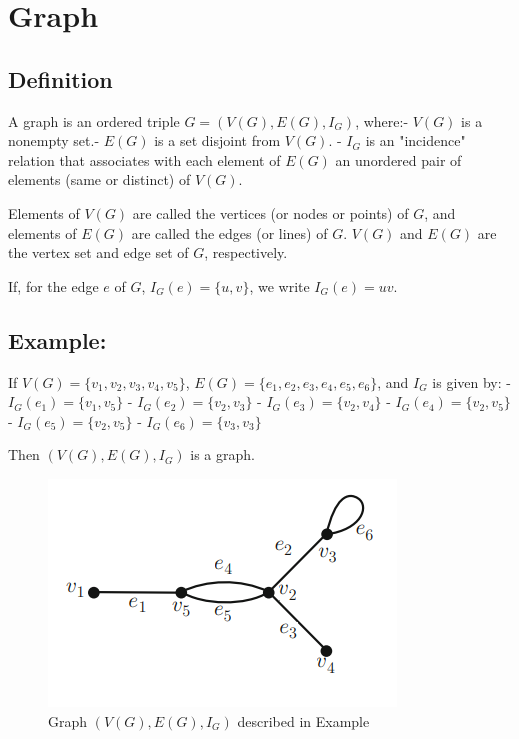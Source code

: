 \documentclass[a4paper,12pt]{report}
\begin{document}
         
         	
         	\section*{Graph}
         	\subsection*{Definition}
         	A graph is an ordered triple $G = (V(G), E(G), I_G)$, where:- $V(G)$ is a nonempty set.- $E(G)$ is a set disjoint from $V(G)$.
         	- $I_G$ is an "incidence" relation that associates with each element of $E(G)$ an unordered pair of elements (same or distinct) of $V(G)$.
         	
         	Elements of $V(G)$ are called the vertices (or nodes or points) of $G$, and elements of $E(G)$ are called the edges (or lines) of $G$. $V(G)$ and $E(G)$ are the vertex set and edge set of $G$, respectively.
         	
         	If, for the edge $e$ of $G$, $I_G(e) = \{u, v\}$, we write $I_G(e) = uv$.
         	
         	\subsection*{Example:}
         	If $V(G) = \{v_1, v_2, v_3, v_4, v_5\}$, $E(G) = \{e_1, e_2, e_3, e_4, e_5, e_6\}$, and $I_G$ is given by:
         	- $I_G(e_1) = \{v_1, v_5\}$
         	- $I_G(e_2) = \{v_2, v_3\}$
         	- $I_G(e_3) = \{v_2, v_4\}$
         	- $I_G(e_4) = \{v_2, v_5\}$
         	- $I_G(e_5) = \{v_2, v_5\}$
         	- $I_G(e_6) = \{v_3, v_3\}$
         	
         	Then $(V(G), E(G), I_G)$ is a graph.
         	
         		\begin{figure}[h!]
         		\centering
         		
         		\includegraphics[scale=1]{Figure1}
         		\caption{Graph  $(V(G), E(G), I_G)$ described in Example}
         	\end{figure}
         
\end{document}
